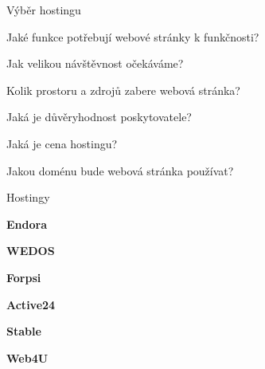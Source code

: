\documentclass[aspectratio=1610]{beamer}
\begin{document}
\begin{frame}{Výběr hostingu}
    \begin{cardTiny}
        \begin{flushleft}
            Jaké funkce potřebují webové stránky k funkčnosti?

            Jak velikou návštěvnost očekáváme?

            Kolik prostoru a zdrojů zabere webová stránka?

            Jaká je důvěryhodnost poskytovatele?

            Jaká je cena hostingu?

            Jakou doménu bude webová stránka používat?
        \end{flushleft}
    \end{cardTiny}
\end{frame}

\begin{frame}{Hostingy}
    \begin{multicols}{3}
        \centering

        \begin{cardTiny}
            \begin{center}
                \textbf{Endora}
            \end{center}
        \end{cardTiny}

        \begin{cardTiny}
            \begin{center}
                \textbf{WEDOS}
            \end{center}
        \end{cardTiny}

        \begin{cardTiny}
            \begin{center}
                \textbf{Forpsi}
            \end{center}
        \end{cardTiny}

        \begin{cardTiny}
            \begin{center}
                \textbf{Active24}
            \end{center}
        \end{cardTiny}

        \begin{cardTiny}
            \begin{center}
                \textbf{Stable}
            \end{center}
        \end{cardTiny}

        \begin{cardTiny}
            \begin{center}
                \textbf{Web4U}
            \end{center}
        \end{cardTiny}
    \end{multicols}
\end{frame}
\end{document}

